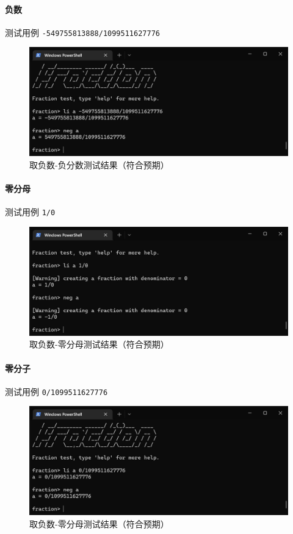 \documentclass[cn,black,12pt,normal]{elegantnote}
\begin{document}
\paragraph{负数} 测试用例 \lstinline{-549755813888/1099511627776}
\begin{figure}[H]
    \centering
    \includegraphics[width=.8\textwidth]{imgs/test_neg_negative_frac.jpg}
    \caption{取负数-负分数测试结果（符合预期）}
\end{figure}

\paragraph{零分母} 测试用例 \lstinline{1/0}
\begin{figure}[H]
    \centering
    \includegraphics[width=.8\textwidth]{imgs/test_neg_zero1.jpg}
    \caption{取负数-零分母测试结果（符合预期）}
\end{figure}

\paragraph{零分子} 测试用例 \lstinline{0/1099511627776}
\begin{figure}[H]
    \centering
    \includegraphics[width=.8\textwidth]{imgs/test_neg_zero2.jpg}
    \caption{取负数-零分母测试结果（符合预期）}
\end{figure}
\end{document}
